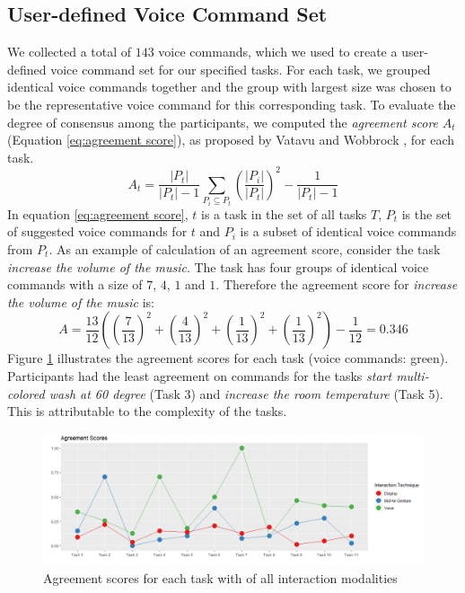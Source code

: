 \documentclass[sigchi]{acmart}
\begin{document}
	\subsection{User-defined Voice Command Set}
We collected a total of $143$ voice commands, which we used to create a user-defined voice command set for our specified tasks. For each task, we grouped identical voice commands together and the group with largest size was chosen to be the representative voice command for this corresponding task. To evaluate the degree of consensus among the participants, we computed the \textit{agreement score} $A_t$ (Equation \ref{eq:agreement score}), as proposed by Vatavu and Wobbrock \cite{Vatavu.2015}, for each task.
		\begin{equation}
			\label{eq:agreement score}
			A_t = \frac{|P_t|}{|P_t|-1} \sum_{P_i \subseteq P_t} \left(\frac{|P_i|}{|P_t|}\right)^2  - \frac{1}{|P_t|-1}
		\end{equation}
In equation \ref{eq:agreement score}, $t$ is a task in the set of all tasks $T$, $P_t$ is the set of suggested voice commands for $t$ and $P_i$ is a subset of identical voice commands from $P_t$. 
As an example of calculation of an agreement score, consider the task \textit{increase the volume of the music}. The task has four groups of identical voice commands with a size of $7$, $4$, $1$ and $1$. Therefore the agreement score for \textit{increase the volume of the music} is:
		\begin{equation}
			A = \frac{13}{12} \left(\left(\frac{7}{13}\right)^2 + \left(\frac{4}{13}\right)^2 + \left(\frac{1}{13}\right)^2 + \left(\frac{1}{13}\right)^2 \right)- \frac{1}{12} = 0.346
		\end{equation}
		Figure \ref{figure:ASall} illustrates the agreement scores for each task (voice commands: green). Participants had the least agreement on commands for the tasks \textit{start multi-colored wash at 60 degree} (Task 3) and \textit{increase the room temperature} (Task 5). This is attributable to the complexity of the tasks.
		\begin{figure}			
			\centering
			\includegraphics[width=\textwidth]{AgreementScoresAllTechniques}
			\caption{Agreement scores for each task with of all interaction modalities}
			\label{figure:ASall}
		\end{figure}
\end{document}
